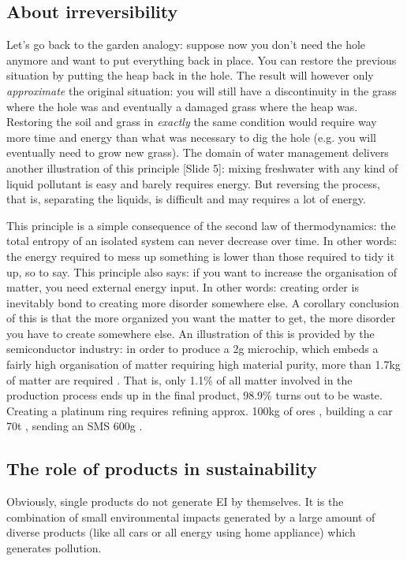 \documentclass{article}
\begin{document}
\subsection{About irreversibility}
\label{sec:irreversibility}
Let's go back to the garden analogy: suppose now you don't need the hole anymore and want to put everything back in place. You can restore the previous situation by putting the heap back in the hole. The result will however only \emph{approximate} the original situation: you will still have a discontinuity in the grass where the hole was and eventually a damaged grass where the heap was. Restoring the soil and grass in \emph{exactly} the same condition would require way more time and energy than what was necessary to dig the hole (e.g. you will eventually need to grow new grass). The domain of water management delivers another illustration of this principle {\color{blue}[Slide 5]}: mixing freshwater with any kind of liquid pollutant is easy and barely requires energy. But reversing the process, that is, separating the liquids, is difficult and may requires a lot of energy.

This principle is a simple consequence of the second law of thermodynamics: the total entropy of an isolated system can never decrease over time. In other words: the energy required to mess up something is lower than those required to tidy it up, so to say. This principle also says: if you want to increase the organisation of matter, you need external energy input. In other words: creating order is inevitably bond to creating more disorder somewhere else. A corollary conclusion of this is that the more organized you want the matter to get, the more disorder you have to create somewhere else. An illustration of this is provided by the semiconductor industry: in order to produce a 2g microchip, which embeds a fairly high organisation of matter requiring high material purity, more than 1.7kg of matter are required \cite{williamsKilogramMicrochipEnergy2002}. That is, only 1.1\% of all matter involved in the production process ends up in the final product, 98.9\% turns out to be waste. Creating a platinum ring requires refining approx. 100kg of ores \cite{erkmanVersEcologieIndustrielle2004}, building a car 70t \cite{janinDemarcheEcoconceptionEntreprise2000}, sending an SMS 600g \cite{federico2001mips}.

\subsection{The role of products in sustainability}
\label{sec:tbd}
Obviously, single products do not generate EI by themselves. It is the combination of small environmental impacts generated by a large amount of diverse products (like all cars or all energy using home appliance) which generates pollution.
\end{document}

